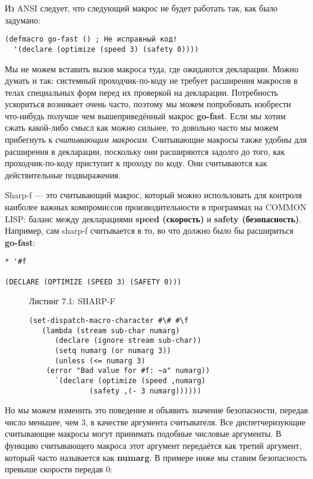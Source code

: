 Из ANSI следует, что следующий макрос не будет работать так, как было задумано:

\begin{verbatim}
(defmacro go-fast () ; Не исправный код!
  '(declare (optimize (speed 3) (safety 0))))
\end{verbatim}

Мы не можем вставить вызов макроса туда, где ожидаются декларации. Можно думать и так: системный проходчик-по-коду не требует расширения макросов в телах специальных форм перед их проверкой на декларации. Потребность ускориться возникает очень часто, поэтому мы можем попробовать изобрести что-нибудь получше чем вышеприведённый макрос \textbf{go-fast}. Если мы хотим сжать какой-либо смысл как можно сильнее, то довольно часто мы можем прибегнуть к \emph{считывающим макросам}. Считывающие макросы также удобны для расширения в декларации, поскольку они расширяются задолго до того, как проходчик-по-коду приступит к проходу по коду. Они считываются как действительные подвыражения.

Sharp-f --- это считывающий макрос, который можно использовать для контроля наиболее важных компромиссов производительности в программах на COMMON LISP: баланс между декларациями \textbf{speed (скорость)} и \textbf{safety (безопасность)}. Например, сам sharp-f считывается в то, во что должно было бы расшириться \textbf{go-fast}:

\begin{verbatim}
* '#f

(DECLARE (OPTIMIZE (SPEED 3) (SAFETY 0)))
\end{verbatim}

\begin{figure}Листинг 7.1: SHARP-F\label{listing_7.1}
\listbegin
\begin{verbatim}
(set-dispatch-macro-character #\# #\f
   (lambda (stream sub-char numarg)
      (declare (ignore stream sub-char))
      (setq numarg (or numarg 3))
      (unless (<= numarg 3)
	(error "Bad value for #f: ~a" numarg))
      `(declare (optimize (speed ,numarg)
			  (safety ,(- 3 numarg))))))
\end{verbatim}
\listend
\end{figure}

Но мы можем изменить это поведение и объявить значение безопасности, передав число меньшее, чем 3, в качестве аргумента считывателя. Все диспетчеризующие считывающие макросы могут принимать подобные числовые аргументы. В функцию считывающего макроса этот аргумент передаётся как третий аргумент, который часто называется как \textbf{numarg}. В примере ниже мы ставим безопасность превыше скорости передав 0:

